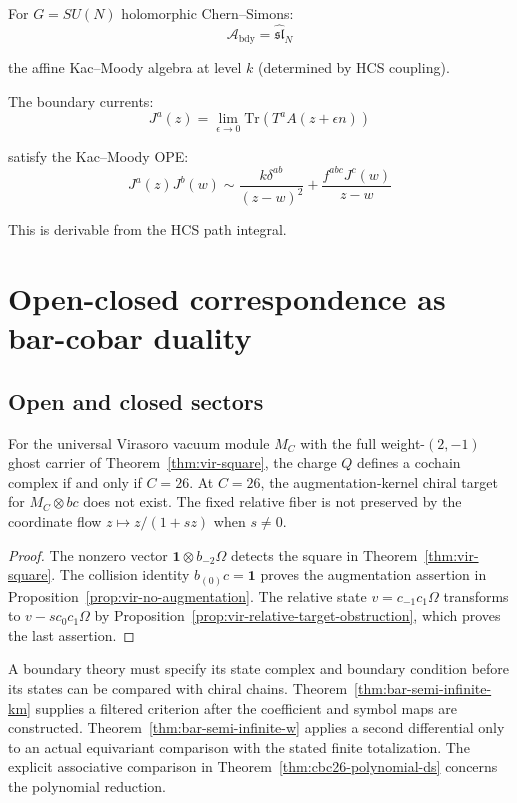 \begin{example}
For $G = SU(N)$ holomorphic Chern--Simons:
\[\mathcal{A}_{\text{bdy}} = \widehat{\mathfrak{sl}}_N\]

the affine Kac--Moody algebra at level $k$ (determined by HCS coupling).

The boundary currents:
\[J^a(z) = \lim_{\epsilon \to 0} \text{Tr}(T^a A(z + \epsilon n))\]

satisfy the Kac--Moody OPE:
\[J^a(z) J^b(w) \sim \frac{k \delta^{ab}}{(z-w)^2} +
\frac{f^{abc} J^c(w)}{z-w}\]

This is derivable from the HCS path integral.
\end{example}

\section{Open-closed correspondence as bar-cobar duality}

\subsection{Open and closed sectors}

\begin{proposition}
\label{thm:open-string-bar}
For the universal Virasoro vacuum module $M_C$ with the full weight-$(2,-1)$ ghost carrier of Theorem~\ref{thm:vir-square}, the charge $Q$ defines a cochain complex if and only if $C=26$.
At $C=26$, the augmentation-kernel chiral target for $M_C\otimes bc$ does not exist.
The fixed relative fiber is not preserved by the coordinate flow $z\mapsto z/(1+sz)$ when $s\ne0$.
\end{proposition}

\begin{proof}
The nonzero vector $\mathbf1\otimes b_{-2}\Omega$ detects the square in Theorem~\ref{thm:vir-square}.
The collision identity $b_{(0)}c=\mathbf1$ proves the augmentation assertion in Proposition~\ref{prop:vir-no-augmentation}.
The relative state $v=c_{-1}c_1\Omega$ transforms to $v-sc_0c_1\Omega$ by Proposition~\ref{prop:vir-relative-target-obstruction}, which proves the last assertion.
\end{proof}

A boundary theory must specify its state complex and boundary condition before its states can be compared with chiral chains.
Theorem~\ref{thm:bar-semi-infinite-km} supplies a filtered criterion after the coefficient and symbol maps are constructed.
Theorem~\ref{thm:bar-semi-infinite-w} applies a second differential only to an actual equivariant comparison with the stated finite totalization.
The explicit associative comparison in Theorem~\ref{thm:cbc26-polynomial-ds} concerns the polynomial reduction.

